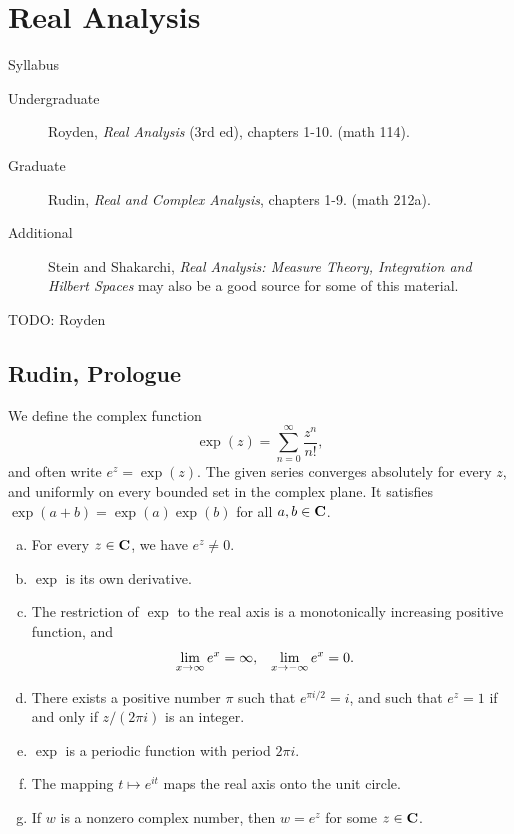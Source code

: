 \section{Real Analysis}
\label{S:real-analysis}

Syllabus
\begin{description}
\item[Undergraduate] Royden, \emph{Real Analysis} (3rd ed), chapters 1-10. (math 114).
\item[Graduate] Rudin, \emph{Real and Complex Analysis}, chapters 1-9. (math 212a).
\item[Additional] Stein and Shakarchi, \emph{Real Analysis: Measure Theory, Integration and Hilbert Spaces} may also be a good source for some of this material.
\end{description}

TODO: Royden

\subsection{Rudin, Prologue}

We define the complex function
\[
\exp(z) = \sum_{n=0}^\infty \frac{z^n}{n!},
\]
and often write $e^z = \exp(z)$. The given series converges absolutely for every $z$, and uniformly on every bounded set in the complex plane. It satisfies $\exp(a+b) = \exp(a)\exp(b)$ for all $a,b \in \mathbf{C}$.

\begin{theorem}
  \mbox{}
  \begin{enumerate}[(a)]
  \item For every $z \in \mathbf{C}$, we have $e^z \neq 0$.
  \item $\exp$ is its own derivative.
  \item The restriction of $\exp$ to the real axis is a monotonically increasing positive function, and
    \begin{align*}
      \lim_{x \rightarrow \infty} e^x &= \infty, &
      \lim_{x \rightarrow -\infty} e^x &= 0.
    \end{align*}
  \item There exists a positive number $\pi$ such that $e^{\pi i/2} = i$, and such that $e^z = 1$ if and only if $z/(2\pi i)$ is an integer.
  \item $\exp$ is a periodic function with period $2 \pi i$.
  \item The mapping $t \mapsto e^{i t}$ maps the real axis onto the unit circle.
  \item If $w$ is a nonzero complex number, then $w = e^z$ for some $z \in \mathbf{C}$.
  \end{enumerate}
\end{theorem}

